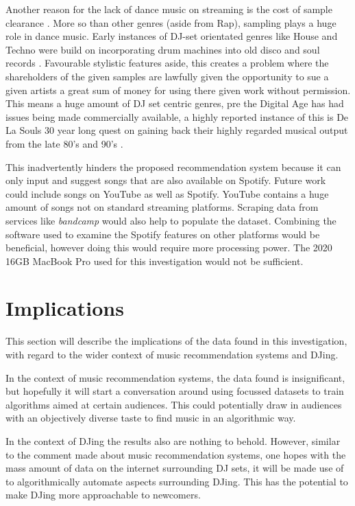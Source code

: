 Another reason for the lack of dance music on streaming is the cost of sample clearance \citep{morey_copyright_2013}. More so than other genres (aside from Rap), sampling plays a huge role in dance music. Early instances of DJ-set orientated genres like House and Techno were build on incorporating drum machines into old disco and soul records \citep{reynolds_energy_2013}. Favourable stylistic features aside, this creates a problem where the shareholders of the given samples are lawfully given the opportunity to sue a given artists a great sum of money for using there given work without permission. This means a huge amount of DJ set centric genres, pre the Digital Age has had issues being made commercially available, a highly reported instance of this is De La Souls 30 year long quest on gaining back their highly regarded musical output from the late 80's and 90's \citep{saunders_soul_2023}.

This inadvertently hinders the proposed recommendation system because it can only input and suggest songs that are also available on Spotify. Future work could include songs on YouTube as well as Spotify. YouTube contains a huge amount of songs not on standard streaming platforms. Scraping data from services like \textit{bandcamp } would also help to populate the dataset. Combining the software used to examine the Spotify features on other platforms would be beneficial, however doing this would require more processing power. The 2020 16GB MacBook Pro used for this investigation would not be sufficient.



\section{Implications}
This section will describe the implications of the data found in this investigation, with regard to the
wider context of music recommendation systems and DJing.

In the context of music recommendation systems, the data found is insignificant, but hopefully it will start a conversation around using focussed datasets to train algorithms aimed at certain audiences. This could potentially draw in audiences with an objectively diverse taste to find music in an algorithmic way.

In the context of DJing the results also are nothing to behold. However, similar to the comment made about music recommendation systems, one hopes with the mass amount of data on the internet surrounding DJ sets, it will be made use of to algorithmically automate aspects surrounding DJing. This has the potential to make DJing more approachable to newcomers. 


